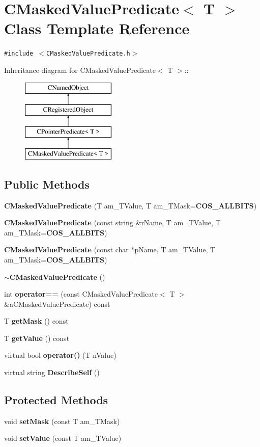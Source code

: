 \section{CMasked\-Value\-Predicate$<$ T $>$  Class Template Reference}
\label{classCMaskedValuePredicate}
{\tt \#include $<$CMasked\-Value\-Predicate.h$>$}

Inheritance diagram for CMasked\-Value\-Predicate$<$ T $>$::\begin{figure}[H]
\begin{center}
\leavevmode
\includegraphics[height=4cm]{classCMaskedValuePredicate}
\end{center}
\end{figure}
\subsection*{Public Methods}
\begin{CompactItemize}
\item 
{\bf CMasked\-Value\-Predicate} (T am\_\-TValue, T am\_\-TMask={\bf COS\_\-ALLBITS})
\item 
{\bf CMasked\-Value\-Predicate} (const string \&r\-Name, T am\_\-TValue, T am\_\-TMask={\bf COS\_\-ALLBITS})
\item 
{\bf CMasked\-Value\-Predicate} (const char $\ast$p\-Name, T am\_\-TValue, T am\_\-TMask={\bf COS\_\-ALLBITS})
\item 
{\bf $\sim$CMasked\-Value\-Predicate} ()
\item 
int {\bf operator==} (const CMasked\-Value\-Predicate$<$ T $>$ \&a\-CMasked\-Value\-Predicate) const
\item 
T {\bf get\-Mask} () const
\item 
T {\bf get\-Value} () const
\item 
virtual bool {\bf operator()} (T n\-Value)
\item 
virtual string {\bf Describe\-Self} ()
\end{CompactItemize}
\subsection*{Protected Methods}
\begin{CompactItemize}
\item 
void {\bf set\-Mask} (const T am\_\-TMask)
\item 
void {\bf set\-Value} (const T am\_\-TValue)
\end{CompactItemize}
